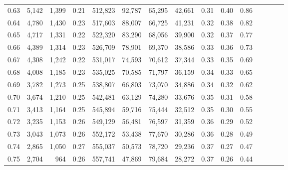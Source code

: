 \begin{tabular}{rrrcrrrrrrrrrrr}
0.63 &   5,142 &   1,399 &                                       0.21 &  512,823 &   92,787 &   65,295 &   42,661 &  0.31 &  0.40 &                         0.86 \\
0.64 &   4,780 &   1,430 &                                       0.23 &  517,603 &   88,007 &   66,725 &   41,231 &  0.32 &  0.38 &                         0.82 \\
0.65 &   4,717 &   1,331 &                                       0.22 &  522,320 &   83,290 &   68,056 &   39,900 &  0.32 &  0.37 &                         0.77 \\
0.66 &   4,389 &   1,314 &                                       0.23 &  526,709 &   78,901 &   69,370 &   38,586 &  0.33 &  0.36 &                         0.73 \\
0.67 &   4,308 &   1,242 &                                       0.22 &  531,017 &   74,593 &   70,612 &   37,344 &  0.33 &  0.35 &                         0.69 \\
0.68 &   4,008 &   1,185 &                                       0.23 &  535,025 &   70,585 &   71,797 &   36,159 &  0.34 &  0.33 &                         0.65 \\
0.69 &   3,782 &   1,273 &                                       0.25 &  538,807 &   66,803 &   73,070 &   34,886 &  0.34 &  0.32 &                         0.62 \\
0.70 &   3,674 &   1,210 &                                       0.25 &  542,481 &   63,129 &   74,280 &   33,676 &  0.35 &  0.31 &                         0.58 \\
0.71 &   3,413 &   1,164 &                                       0.25 &  545,894 &   59,716 &   75,444 &   32,512 &  0.35 &  0.30 &                         0.55 \\
0.72 &   3,235 &   1,153 &                                       0.26 &  549,129 &   56,481 &   76,597 &   31,359 &  0.36 &  0.29 &                         0.52 \\
0.73 &   3,043 &   1,073 &                                       0.26 &  552,172 &   53,438 &   77,670 &   30,286 &  0.36 &  0.28 &                         0.49 \\
0.74 &   2,865 &   1,050 &                                       0.27 &  555,037 &   50,573 &   78,720 &   29,236 &  0.37 &  0.27 &                         0.47 \\
0.75 &   2,704 &     964 &                                       0.26 &  557,741 &   47,869 &   79,684 &   28,272 &  0.37 &  0.26 &                         0.44 \\

\end{tabular}
